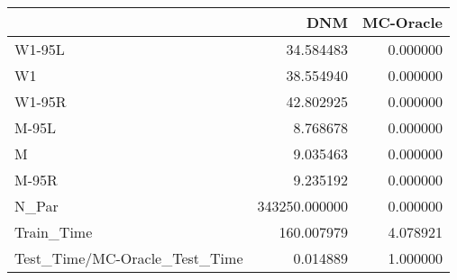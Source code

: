 \begin{tabular}{lrr}
\toprule
{} &            DNM &  MC-Oracle \\
\midrule
W1-95L                        &      34.584483 &   0.000000 \\
W1                            &      38.554940 &   0.000000 \\
W1-95R                        &      42.802925 &   0.000000 \\
M-95L                         &       8.768678 &   0.000000 \\
M                             &       9.035463 &   0.000000 \\
M-95R                         &       9.235192 &   0.000000 \\
N\_Par                         &  343250.000000 &   0.000000 \\
Train\_Time                    &     160.007979 &   4.078921 \\
Test\_Time/MC-Oracle\_Test\_Time &       0.014889 &   1.000000 \\
\bottomrule
\end{tabular}
